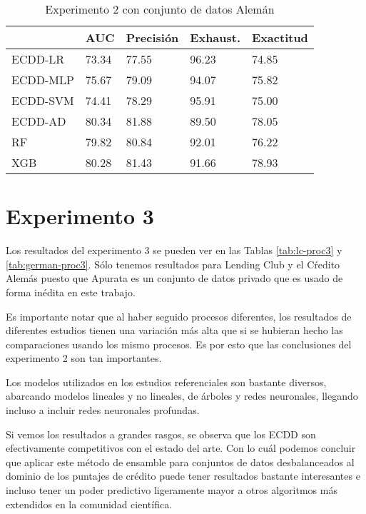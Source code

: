 \begin{table}[]
\centering
\caption{Experimento 2 con conjunto de datos Alemán}
\label{tab:german-proc2}
\begin{tabularx}{0.75\textwidth}{|l|Y Y Y Y|}
				\hline
				& AUC		& Precisión	& Exhaust.		& Exactitud	\\
				\hline
ECDD-LR			& 73.34		& 77.55		& 96.23			& 74.85		\\
ECDD-MLP		& 75.67		& 79.09		& 94.07			& 75.82		\\
ECDD-SVM		& 74.41		& 78.29		& 95.91			& 75.00		\\
ECDD-AD			& 80.34		& 81.88		& 89.50			& 78.05		\\
				\hline
RF				& 79.82		& 80.84		& 92.01			& 76.22		\\
XGB				& 80.28		& 81.43		& 91.66			& 78.93		\\
				\hline
\end{tabularx}
\end{table}


\section{Experimento 3} %

Los resultados del experimento 3 se pueden ver en las Tablas \ref{tab:lc-proc3} y \ref{tab:german-proc3}. Sólo tenemos resultados para Lending Club y el Cŕedito Alemás puesto que Apurata es un conjunto de datos privado que es usado de forma inédita en este trabajo.

Es importante notar que al haber seguido procesos diferentes, los resultados de diferentes estudios tienen una variación más alta que si se hubieran hecho las comparaciones usando los mismo procesos. Es por esto que las conclusiones del experimento 2 son tan importantes.

Los modelos utilizados en los estudios referenciales son bastante diversos, abarcando modelos lineales y no lineales, de árboles y redes neuronales, llegando incluso a incluir redes neuronales profundas.

Si vemos los resultados a grandes rasgos, se observa que los \ac{ECDD} son efectivamente competitivos con el estado del arte. Con lo cuál podemos concluir que aplicar este método de ensamble para conjuntos de datos desbalanceados al dominio de los puntajes de crédito puede tener resultados bastante interesantes e incluso tener un poder predictivo ligeramente mayor a otros algoritmos más extendidos en la comunidad científica.


